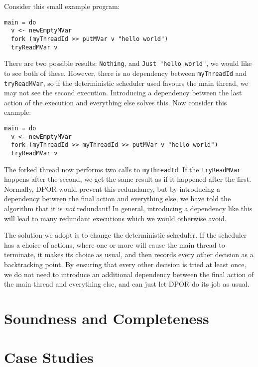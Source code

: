 Consider this small example program:

\begin{lstlisting}
main = do
  v <- newEmptyMVar
  fork (myThreadId >> putMVar v "hello world")
  tryReadMVar v
\end{lstlisting}

There are two possible results: \verb|Nothing|, and
\verb|Just "hello world"|, we would like to see both of these.
However, there is no dependency between \verb|myThreadId| and
\verb|tryReadMVar|, so if the deterministic scheduler used favours the
main thread, we may not see the second execution.  Introducing a
dependency between the last action of the execution and everything
else solves this.  Now consider this example:

\begin{lstlisting}
main = do
  v <- newEmptyMVar
  fork (myThreadId >> myThreadId >> putMVar v "hello world")
  tryReadMVar v
\end{lstlisting}

The forked thread now performs two calls to \verb|myThreadId|.  If the
\verb|tryReadMVar| happens after the second, we get the same result as
if it happened after the first.  Normally, DPOR would prevent this
redundancy, but by introducing a dependency between the final action
and everything else, we have told the algorithm that it is \emph{not}
redundant!  In general, introducing a dependency like this will lead
to many redundant executions which we would otherwise avoid.

The solution we adopt is to change the deterministic scheduler.  If
the scheduler has a choice of actions, where one or more will cause
the main thread to terminate, it makes its choice as usual, and then
records every other decision as a backtracking point.  By ensuring
that every other decision is tried at least once, we do not need to
introduce an additional dependency between the final action of the
main thread and everything else, and can just let DPOR do its job as
usual.

\section{Soundness and Completeness}
\label{sec:dejafu-correctness}

\blindtext

\section{Case Studies}
\label{sec:dejafu-casestudies}

